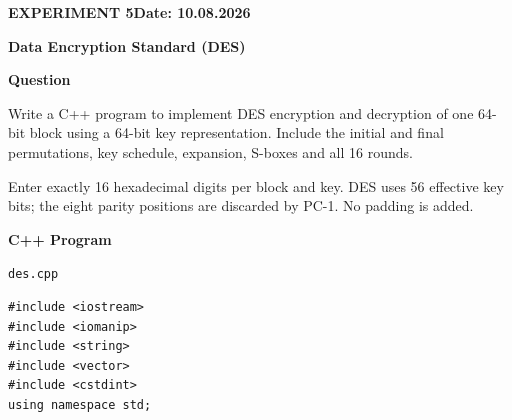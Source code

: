 \documentclass[11pt,a4paper]{article}
\newcommand{\blocktitle}[1]{\Needspace{6\baselineskip}\par\textbf{#1}\par}
\begin{document}
\clearpage
{}\label{exp:des}
{\small\bfseries EXPERIMENT 5\hfill Date: 10.08.2026\par}
{\Large\bfseries Data Encryption Standard (DES)\par}
\vspace{2mm}
\blocktitle{Question}
Write a C++ program to implement DES encryption and decryption of one 64-bit block using a 64-bit key representation. Include the initial and final permutations, key schedule, expansion, S-boxes and all 16 rounds.

Enter exactly 16 hexadecimal digits per block and key. DES uses 56 effective key bits; the eight parity positions are discarded by PC-1. No padding is added.

\blocktitle{C++ Program}
{\small\texttt{des.cpp}\par}
\begin{lstlisting}[style=cpp]
#include <iostream>
#include <iomanip>
#include <string>
#include <vector>
#include <cstdint>
using namespace std;


\end{lstlisting}
\end{document}
